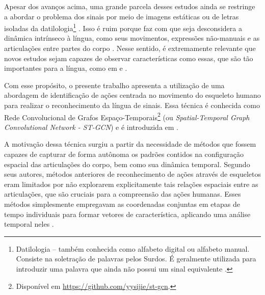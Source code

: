 Apesar dos avanços acima, uma grande parcela desses estudos ainda se restringe a abordar o problema dos sinais por meio de imagens estáticas ou de letras isoladas da datilologia\footnote{
     Datilologia – também conhecida como alfabeto digital ou alfabeto manual. Consiste na soletração de palavras pelos Surdos. É geralmente utilizada para introduzir uma palavra que ainda não possui um sinal equivalente \cite{quadros-2004, pereira-choi-2011}.
} \cite{shanta-2018, taskiran-2018, elbadawy-2017, das-2018, sajanraj-2018}. Isso é ruim porque faz com que seja desconsidera a dinâmica intrínseco à língua, como seus movimentos, expressões não-manuais e as articulações entre partes do corpo \cite{quadros-2004}. Nesse sentido, é extremamente relevante que novos estudos sejam capazes de observar características como essas, que são tão importantes para a língua, como em \cite{konstantinidis-2018} e \cite{pigou-2017}. 

Com esse propósito, o presente trabalho apresenta a utilização de uma abordagem de identificação de ações centrada no movimento do esqueleto humano para realizar o reconhecimento da língua de sinais. Essa técnica é conhecida como Rede Convolucional de Grafos Espaço-Temporais\footnote{
    Disponível em \url{https://github.com/yysijie/st-gcn}.
} (ou \textit{Spatial-Temporal Graph Convolutional Network - ST-GCN}) e é introduzida em \cite{st-gcn-2018}. 

A motivação dessa técnica surgiu a partir da necessidade de métodos que fossem capazes de capturar de forma autônoma os padrões contidos na configuração espacial das articulações do corpo, bem como sua dinâmica temporal. Segundo seus autores, métodos anteriores de reconhecimento de ações através de esqueletos eram limitados por não explorarem explicitamente tais relações espaciais entre as articulações, que são cruciais para a compreensão das ações humanas. Esses métodos simplesmente empregavam as coordenadas conjuntas em etapas de tempo individuais para formar vetores de característica, aplicando uma análise temporal neles \cite{st-gcn-2018, wang-2012, fernando-2015}.



